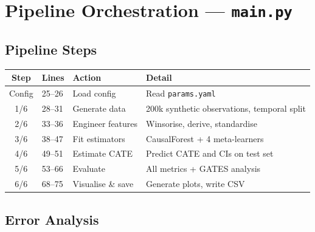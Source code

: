 \documentclass[11pt, letterpaper]{article}
\begin{document}
\section{Pipeline Orchestration --- \texttt{main.py}}
\label{sec:main}

\subsection{Pipeline Steps}

\begin{center}
\begin{tabularx}{\textwidth}{c l l X}
    \toprule
    \textbf{Step} & \textbf{Lines} & \textbf{Action} & \textbf{Detail} \\
    \midrule
    Config & 25--26  & Load config         & Read \texttt{params.yaml} \\
    1/6    & 28--31  & Generate data       & 200k synthetic observations, temporal split \\
    2/6    & 33--36  & Engineer features   & Winsorise, derive, standardise \\
    3/6    & 38--47  & Fit estimators      & CausalForest + 4 meta-learners \\
    4/6    & 49--51  & Estimate CATE       & Predict CATE and CIs on test set \\
    5/6    & 53--66  & Evaluate            & All metrics + GATES analysis \\
    6/6    & 68--75  & Visualise \& save   & Generate plots, write CSV \\
    \bottomrule
\end{tabularx}
\end{center}

\subsection{Error Analysis}
\end{document}
